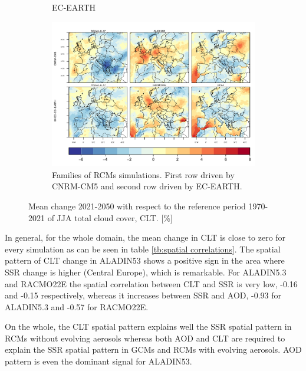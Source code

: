 \begin{figure}[h]
\begin{subfigure}{0.4\textwidth}
    \caption{EC-EARTH}
  \end{subfigure}
  \hspace{0.1mm}
  \centering\begin{subfigure}{1\textwidth}  
    \includegraphics[width=1\textwidth]{figs/capitulo7/ANOMALIAS_JJA_CLT_2050-2021_r12.pdf}
\caption{Families of RCMs simulations. First row driven by CNRM-CM5 and second row driven by EC-EARTH.}
\end{subfigure}
\caption[Change in summer CLT over Europe for the period 2021-2050 with respect of 1971-2000 with different climate models]{Mean change 2021-2050 with respect to the reference period 1970-2021 of JJA total cloud cover, CLT. [\%]}
\label{fig:anomalyCLT}      
\end{figure}

In general, for the whole domain, the mean change in CLT is close to zero for every simulation as can be seen in table \ref{tb:spatial correlations}. The spatial pattern of CLT change in ALADIN53 shows a positive sign in the area where SSR change is higher (Central Europe), which is remarkable. For ALADIN5.3 and RACMO22E the spatial correlation between CLT and SSR is very low, -0.16 and -0.15 respectively, whereas it increases between SSR and AOD, -0.93 for ALADIN5.3 and -0.57 for RACMO22E.

On the whole, the CLT spatial pattern explains well the SSR spatial pattern in RCMs without evolving aerosols whereas both AOD and CLT are required to explain the SSR spatial pattern in GCMs and RCMs with evolving aerosols. AOD pattern is even the dominant signal for ALADIN53.



